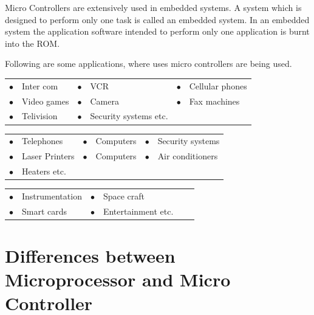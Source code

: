 Micro Controllers are extensively used in embedded systems. A system which is designed to perform only one task is called an embedded system. In an embedded system the application software intended to perform only one application is burnt into the ROM.

Following are some applications, where uses micro controllers are being used.

\smallskip
{}
\begin{center}
\begin{tabular}{l@{\;\,}l@{\qquad}l@{\;\,}l@{\qquad}l@{\;\,}l}
$\bullet$ & Inter com & $\bullet$ & VCR & $\bullet$ & Cellular phones\\[4pt]
$\bullet$ & Video games &$\bullet$ & Camera & $\bullet$ & Fax machines\\[4pt]
$\bullet$ & Telivision & $\bullet$ & Security systems etc.
\end{tabular}
\end{center}

\begin{center}
\begin{tabular}{l@{\;\,}l@{\qquad}l@{\;\,}l@{\qquad}l@{\;\,}l}
$\bullet$ & Telephones & $\bullet$ & Computers & $\bullet$ & Security systems\\[4pt]
$\bullet$ & Laser Printers & $\bullet$ & Computers & $\bullet$ &
Air conditioners\\[4pt]
$\bullet$ & Heaters etc.
\end{tabular}
\end{center}

\begin{center}
\begin{tabular}{l@{\;\,}l@{\qquad}l@{\;\,}l@{\qquad}l@{\;\,}l}
$\bullet$ &  Instrumentation & $\bullet$ & Space craft\\[4pt]
$\bullet$ &  Smart cards & $\bullet$ & Entertainment etc.
\end{tabular}
\end{center}

\eject

\section{Differences between Microprocessor and Micro Controller}\label{sec7.16}

